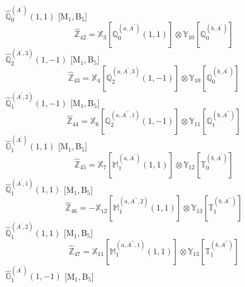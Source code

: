 \documentclass[fleqn,10pt,landscape]{article}
\begin{document}
\begin{itemize}
\begin{dmath*}
\end{dmath*}
\vspace{4mm}
\noindent {} $\,\,\,\hat{\mathbb{Q}}_{0}^{(A^{\prime})}(1,1)$ [M$_{1}$,\,B$_{5}$]
\begin{dmath*}
\hat{\mathbb{Z}}_{42}=\mathbb{X}_{3}[\mathbb{Q}_{0}^{(a,A^{\prime})}(1,1)] \otimes\mathbb{Y}_{10}[\mathbb{Q}_{0}^{(b,A^{\prime})}]
\end{dmath*}
\vspace{4mm}
\noindent {} $\,\,\,\hat{\mathbb{Q}}_{2}^{(A^{\prime},3)}(1,-1)$ [M$_{1}$,\,B$_{5}$]
\begin{dmath*}
\hat{\mathbb{Z}}_{43}=\mathbb{X}_{4}[\mathbb{Q}_{2}^{(a,A^{\prime},3)}(1,-1)] \otimes\mathbb{Y}_{10}[\mathbb{Q}_{0}^{(b,A^{\prime})}]
\end{dmath*}
\vspace{4mm}
\noindent {} $\,\,\,\hat{\mathbb{Q}}_{1}^{(A^{\prime},2)}(1,-1)$ [M$_{1}$,\,B$_{5}$]
\begin{dmath*}
\hat{\mathbb{Z}}_{44}=\mathbb{X}_{6}[\mathbb{Q}_{2}^{(a,A^{\prime\prime},1)}(1,-1)] \otimes\mathbb{Y}_{11}[\mathbb{Q}_{1}^{(b,A^{\prime\prime})}]
\end{dmath*}
\vspace{4mm}
\noindent {} $\,\,\,\hat{\mathbb{G}}_{1}^{(A^{\prime})}(1,1)$ [M$_{1}$,\,B$_{5}$]
\begin{dmath*}
\hat{\mathbb{Z}}_{45}=\mathbb{X}_{7}[\mathbb{M}_{1}^{(a,A^{\prime})}(1,1)] \otimes\mathbb{Y}_{12}[\mathbb{T}_{0}^{(b,A^{\prime})}]
\end{dmath*}
\vspace{4mm}
\noindent {} $\,\,\,\hat{\mathbb{Q}}_{1}^{(A^{\prime},1)}(1,1)$ [M$_{1}$,\,B$_{5}$]
\begin{dmath*}
\hat{\mathbb{Z}}_{46}=- \mathbb{X}_{12}[\mathbb{M}_{1}^{(a,A^{\prime\prime},2)}(1,1)] \otimes\mathbb{Y}_{13}[\mathbb{T}_{1}^{(b,A^{\prime\prime})}]
\end{dmath*}
\vspace{4mm}
\noindent {} $\,\,\,\hat{\mathbb{Q}}_{1}^{(A^{\prime},2)}(1,1)$ [M$_{1}$,\,B$_{5}$]
\begin{dmath*}
\hat{\mathbb{Z}}_{47}=\mathbb{X}_{11}[\mathbb{M}_{1}^{(a,A^{\prime\prime},1)}(1,1)] \otimes\mathbb{Y}_{13}[\mathbb{T}_{1}^{(b,A^{\prime\prime})}]
\end{dmath*}
\vspace{4mm}
\noindent {} $\,\,\,\hat{\mathbb{G}}_{1}^{(A^{\prime})}(1,-1)$ [M$_{1}$,\,B$_{5}$]
\begin{dmath*}

\end{dmath*}
\end{itemize}
\end{document}
